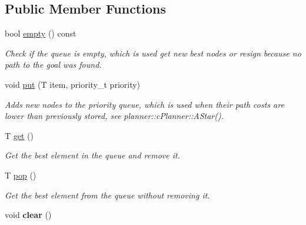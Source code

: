 \subsection*{Public Member Functions}
\begin{DoxyCompactItemize}
\item 
\mbox{\label{structplanner_1_1_priority_queue_a459a18939cb4b02517d5a7db19fd829c}} 
bool \mbox{\hyperlink{structplanner_1_1_priority_queue_a459a18939cb4b02517d5a7db19fd829c}{empty}} () const
\begin{DoxyCompactList}\small\item\em Check if the queue is empty, which is used get new best nodes or resign because no path to the goal was found. \end{DoxyCompactList}\item 
\mbox{\label{structplanner_1_1_priority_queue_afb6cb790e6a592d22a2f05441bfbf23b}} 
void \mbox{\hyperlink{structplanner_1_1_priority_queue_afb6cb790e6a592d22a2f05441bfbf23b}{put}} (T item, priority\+\_\+t priority)
\begin{DoxyCompactList}\small\item\em Adds new nodes to the priority queue, which is used when their path costs are lower than previously stored, see planner\+::c\+Planner\+::\+A\+Star(). \end{DoxyCompactList}\item 
\mbox{\label{structplanner_1_1_priority_queue_abdd3d392da157bb645b5720eace1200a}} 
T \mbox{\hyperlink{structplanner_1_1_priority_queue_abdd3d392da157bb645b5720eace1200a}{get}} ()
\begin{DoxyCompactList}\small\item\em Get the best element in the queue and remove it. \end{DoxyCompactList}\item 
\mbox{\label{structplanner_1_1_priority_queue_abba3d8fcc5729acc424b1fbc38c94e84}} 
T \mbox{\hyperlink{structplanner_1_1_priority_queue_abba3d8fcc5729acc424b1fbc38c94e84}{pop}} ()
\begin{DoxyCompactList}\small\item\em Get the best element from the queue without removing it. \end{DoxyCompactList}\item 
\mbox{\label{structplanner_1_1_priority_queue_aa98bde3a7a3256915f80e1e61572214b}} 
void {\bfseries clear} ()
\end{DoxyCompactItemize}
